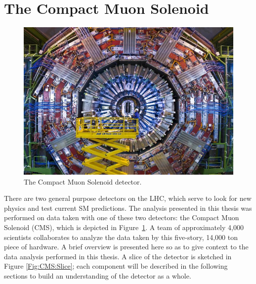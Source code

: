\vspace{5mm}
\section{The Compact Muon Solenoid}

\begin{figure}[h!]
    \centering
        \includegraphics[width=\textwidth]{F3/cms_0}
        \caption{The Compact Muon Solenoid detector.}
        \label{Fig:CMS:cms}
\end{figure}
There are two general purpose detectors on the LHC, which serve to look for new physics and test current SM predictions. The analysis presented in this thesis was performed on data taken with one of these two detectors: the Compact Muon Solenoid (CMS)\cite{Bayatian:922757}, which is depicted in Figure~\ref{Fig:CMS:cms}. A team of approximately 4,000 scientists collaborates to analyze the data taken by this five-story, 14,000 ton piece of hardware. A brief overview is presented here so as to give context to the data analysis performed in this thesis. A slice of the detector is sketched in Figure \ref{Fig:CMS:Slice}; each component will be described in the following sections to build an understanding of the detector as a whole.
